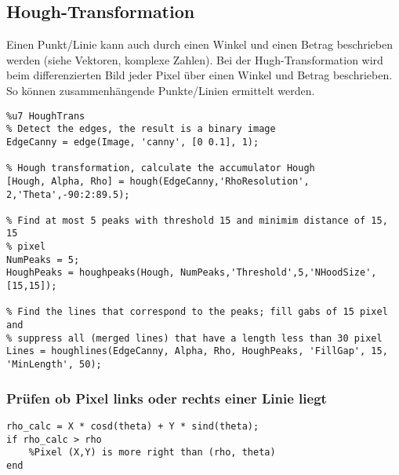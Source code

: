 \subsection{Hough-Transformation}
Einen Punkt/Linie kann auch durch einen Winkel und einen Betrag beschrieben werden (siehe Vektoren, komplexe Zahlen). Bei der Hugh-Transformation wird beim differenzierten Bild jeder Pixel über einen Winkel und Betrag beschrieben. So können zusammenhängende Punkte/Linien ermittelt werden.
\begin{lstlisting}
%u7 HoughTrans
% Detect the edges, the result is a binary image
EdgeCanny = edge(Image, 'canny', [0 0.1], 1);

% Hough transformation, calculate the accumulator Hough
[Hough, Alpha, Rho] = hough(EdgeCanny,'RhoResolution', 2,'Theta',-90:2:89.5);

% Find at most 5 peaks with threshold 15 and minimim distance of 15, 15
% pixel
NumPeaks = 5;
HoughPeaks = houghpeaks(Hough, NumPeaks,'Threshold',5,'NHoodSize',[15,15]);

% Find the lines that correspond to the peaks; fill gabs of 15 pixel and
% suppress all (merged lines) that have a length less than 30 pixel
Lines = houghlines(EdgeCanny, Alpha, Rho, HoughPeaks, 'FillGap', 15, 'MinLength', 50);
\end{lstlisting}

\subsubsection{Prüfen ob Pixel links oder rechts einer Linie liegt}
\begin{lstlisting}
rho_calc = X * cosd(theta) + Y * sind(theta);
if rho_calc > rho
    %Pixel (X,Y) is more right than (rho, theta)
end
\end{lstlisting}
